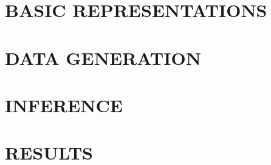 \documentclass[a4paper, 10pt, conference]{ieeeconf}
\begin{document}
\section{BASIC REPRESENTATIONS}
\label{sec:representations}


\section{DATA GENERATION}


\section{INFERENCE}
\label{sec:infer}


\section{RESULTS}
\label{sec:results}


 


%


\addtolength{\textheight}{-12cm}

%
%
\end{document}
